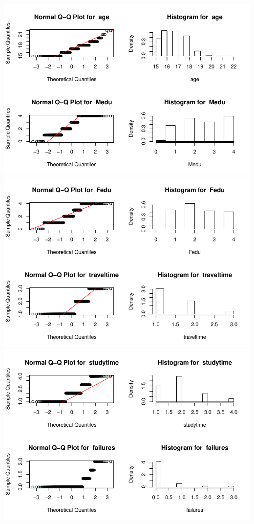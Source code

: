 \documentclass[]{article}
\begin{document}
\includegraphics{Practica2_files/figure-latex/unnamed-chunk-41-1.pdf}
\includegraphics{Practica2_files/figure-latex/unnamed-chunk-41-2.pdf}
\includegraphics{Practica2_files/figure-latex/unnamed-chunk-41-3.pdf}
\end{document}
